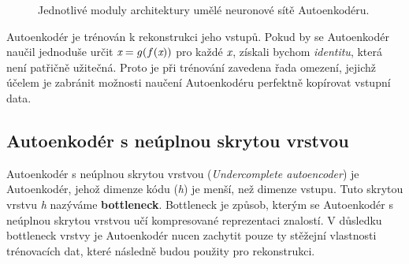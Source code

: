 \begin{figure}[H]
    \centering
    \caption{Jednotlivé moduly architektury umělé neuronové sítě Autoenkodéru. }
    \label{fig:autoencoder}
\end{figure}

Autoenkodér je trénován k rekonstrukci jeho vstupů.
Pokud by se Autoenkodér naučil jednoduše určit $\mathbf{\emph{x}} = g(f(\mathbf{\emph{x}}))$ pro každé $\emph{x}$, získali bychom \emph{identitu}, která není patřičně užitečná.
Proto je při trénování zavedena řada omezení, jejichž účelem je zabránit možnosti naučení Autoenkodéru perfektně kopírovat vstupní data.


\subsection{Autoenkodér s neúplnou skrytou vrstvou}
Autoenkodér s neúplnou skrytou vrstvou (\emph{Undercomplete autoencoder}) je Autoenkodér, jehož dimenze kódu (\emph{h}) je menší, než dimenze vstupu.
Tuto skrytou vrstvu \emph{h} nazýváme \textbf{bottleneck}. Bottleneck je způsob, kterým se Autoenkodér s neúplnou skrytou vrstvou učí kompresované reprezentaci znalostí. 
V důsledku bottleneck vrstvy je Autoenkodér nucen zachytit pouze ty stěžejní vlastnosti trénovacích dat, které následně budou použity pro rekonstrukci.

